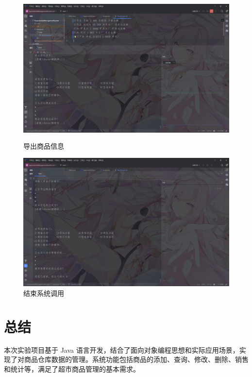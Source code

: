 \documentclass[12pt, a4paper, oneside]{ctexart}
\begin{document}
\begin{figure}[H]
    \begin{minipage}[t]{0.48\textwidth}
        \includegraphics[width=\textwidth]{../images/导出商品信息.png}
        \caption{导出商品信息}
    \end{minipage}
    \hfill
    \begin{minipage}[t]{0.48\textwidth}
        \includegraphics[width=\textwidth]{../images/结束系统调用.png}
        \caption{结束系统调用}
    \end{minipage}
\end{figure}

\section{总结}

\begin{flushleft}
本次实验项目基于 Java 语言开发，结合了面向对象编程思想和实际应用场景，实现了对商品仓库数据的管理。系统功能包括商品的添加、查询、修改、删除、销售和统计等，满足了超市商品管理的基本需求。
\end{flushleft}
\end{document}
